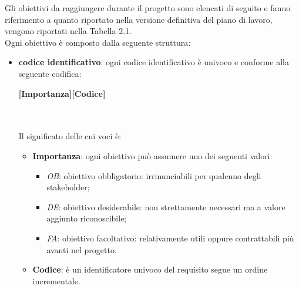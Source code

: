 Gli obiettivi da raggiungere durante il progetto sono elencati di seguito e fanno riferimento a quanto riportato nella versione definitiva del piano di lavoro, 
vengono riportati nella Tabella 2.1.
\\Ogni obiettivo è composto dalla seguente struttura:
\begin{itemize}
	\item \textbf{codice identificativo}: ogni codice identificativo è univoco e conforme alla seguente codifica:\\
	\centerline{\textbf{[Importanza][Codice]}} \\ \\
	Il significato delle cui voci è:
	\begin{itemize}
		\item \textbf{Importanza}: ogni obiettivo può assumere uno dei seguenti valori:
		\begin{itemize}
			\item \textit{OB}: obiettivo obbligatorio: irrinunciabili per qualcuno degli stakeholder;
			\item \textit{DE}: obiettivo desiderabile: non strettamente necessari ma  a valore aggiunto riconoscibile;
			\item \textit{FA}: obiettivo facoltativo: relativamente utili oppure contrattabili più avanti nel progetto.	
		\end{itemize}
		\item \textbf{Codice}: è un identificatore univoco del requisito segue un ordine incrementale.
	\end{itemize}
\end{itemize}

